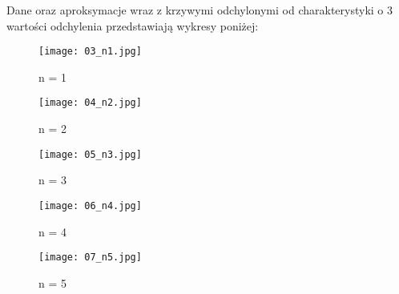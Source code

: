 \documentclass[a4paper,15pt]{article}
\begin{document}
\newpage
Dane oraz aproksymacje wraz z krzywymi odchylonymi od charakterystyki o 3 wartości odchylenia przedstawiają wykresy poniżej:

\begin{figure}[H]


  \texttt{[image: 03\_n1.jpg]}
  \caption{n = 1}
  \label{fig:opt_wiel_2}

\endminipage\hfill
{}%

  \texttt{[image: 04\_n2.jpg]}
  \caption{n = 2}
  \label{fig:opt_wiel_3}

\endminipage

\end{figure}

\begin{figure}[H]


  \texttt{[image: 05\_n3.jpg]}
  \caption{n = 3}
  \label{fig:opt_wiel_2}

\endminipage\hfill
{}%

  \texttt{[image: 06\_n4.jpg]}
  \caption{n = 4}
  \label{fig:opt_wiel_3}

\endminipage

\end{figure}

\begin{figure}[H]


  \texttt{[image: 07\_n5.jpg]}
  \caption{n = 5}
  \label{fig:opt_wiel_2}

\endminipage\hfill


\end{figure}
\end{document}
